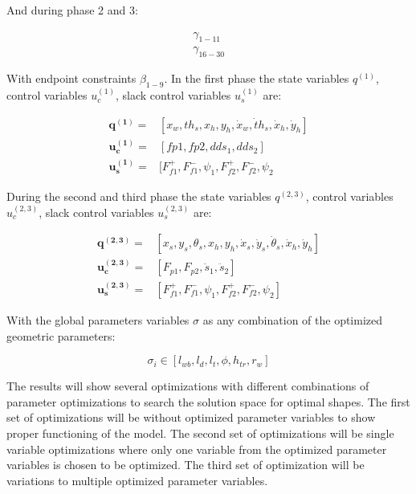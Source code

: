 \documentclass[default,iicol]{sn-jnl}
\begin{document}
And during phase 2 and 3:

\begin{equation}
    \begin{array}{c}
         \gamma_{1-11}  \\
         \gamma_{16-30}
    \end{array}
\end{equation}

With endpoint constraints $\beta_{1-9}$.
In the first phase the state variables $q^{(1)}$, control variables $u_c^{(1)}$, slack control variables $u_s^{(1)}$ are:

\begin{equation}
\begin{array}{rl}
   \mathbf{q^{(1)}} =& [x_w , th_s, x_h, y_h, \dot x_w, \dot th_s,\dot x_h, \dot y_h]    \\
   \mathbf{u_c^{(1)}} =& [fp1, fp2, dds_1, dds_2]  \\
   \mathbf{u_s^{(1)}}=&  [F_{f1}^+, F_{f1}^-, \psi_1,F_{f2}^+, F_{f2}^-, \psi_2 
\end{array}
\end{equation}

During the second and third phase the state variables $q^{(2,3)}$, control variables $u_c^{(2,3)}$, slack control variables $u_s^{(2,3)}$ are:

\begin{equation}
\begin{array}{rl}
   \mathbf{q^{(2,3)}} =& [x_s, y_s, \theta_s, x_h, y_h, \dot x_s, \dot y_s, \dot \theta_s,\dot x_h, \dot y_h]    \\
   \mathbf{u_c^{(2,3)}} =& [F_{p1}, F_{p2}, \ddot s_1, \ddot s_2]  \\
   \mathbf{u_s^{(2,3)}}=&  [F_{f1}^+, F_{f1}^-, \psi_1,F_{f2}^+, F_{f2}^-, \psi_2] 
\end{array}
\end{equation}

With the global parameters variables $\sigma$ as any combination of the optimized geometric parameters: 

\begin{equation}
    \sigma_i \in [l_{wb}, l_d, l_t, \phi, h_{tr}, r_w]
\end{equation}

The results will show several optimizations with different combinations of parameter optimizations to search the solution space for optimal shapes. The first set of optimizations will be without optimized parameter variables to show proper functioning of the model. The second set of optimizations will be single variable optimizations where only one variable from the optimized parameter variables is chosen to be optimized. The third set of optimization will be variations to multiple optimized parameter variables. 
\end{document}
